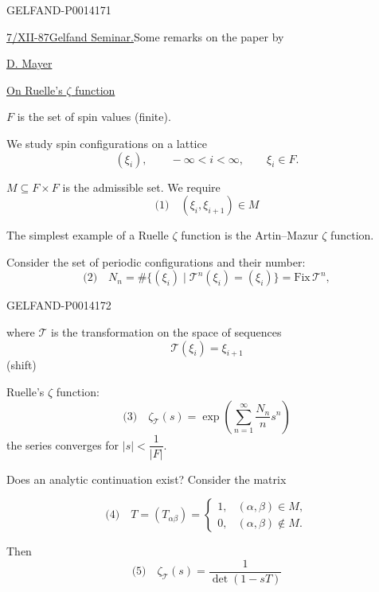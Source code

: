 \begin{GelfandAdjacentEvidence}{GELFAND-P001417}{1}

\uline{7/XII-87}\qquad \uline{Gelfand Seminar.}\qquad Some remarks on the paper by

\uline{D. Mayer}\qquad {}

\uline{On Ruelle’s \(\zeta\) function}

\(F\) is the set of spin values (finite).

We study spin configurations on a lattice
\[
(\xi_i),\qquad -\infty<i<\infty,\qquad \xi_i\in F.
\]

\(M\subseteq F\times F\) is the admissible set. We require
\[
\text{(1)}\quad (\xi_i,\xi_{i+1})\in M
\]

The simplest example of a Ruelle \(\zeta\) function is the Artin–Mazur \(\zeta\) function.

Consider the set of periodic configurations and their number:
\[
\text{(2)}\quad N_n=\#\{(\xi_i)\mid\mathcal T^n(\xi_i)=(\xi_i)\}
=\mathrm{Fix}\,\mathcal T^n,
\]
\end{GelfandAdjacentEvidence}
\begin{GelfandAdjacentEvidence}{GELFAND-P001417}{2}

where \(\mathcal T\) is the transformation on the space of sequences
\[
\mathcal T(\xi_i)=\xi_{i+1}
\]
(shift)

Ruelle’s \(\zeta\) function:
\[
\text{(3)}\quad
\zeta_{\mathcal T}(s)=\exp\left(\sum_{n=1}^{\infty}\frac{N_n}{n}s^n\right)
\]
the series converges for \(|s|<\dfrac{1}{|F|}\).

Does an analytic continuation exist? Consider the matrix
\end{GelfandAdjacentEvidence}

\[
\text{(4)}\quad T=(T_{\alpha\beta})=
\begin{cases}
1,&(\alpha,\beta)\in M,\\
0,&(\alpha,\beta)\notin M.
\end{cases}
\]

Then
\[
\text{(5)}\quad\zeta_{\mathcal T}(s)=\frac{1}{\det(1-sT)}
\]

